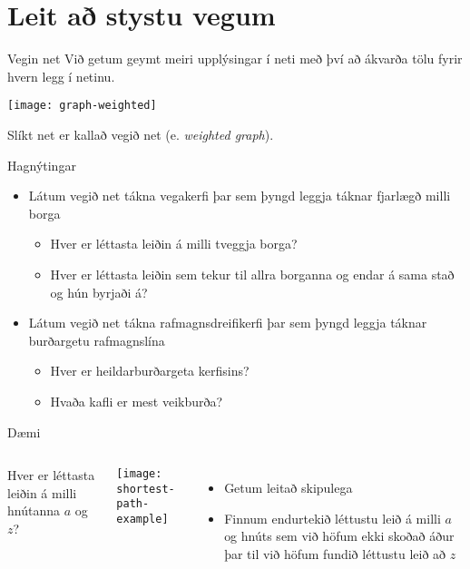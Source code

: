 \documentclass[handout]{beamer}
\begin{document}
\section{Leit að stystu vegum}

\begin{frame}{Vegin net}
Við getum geymt meiri upplýsingar í neti með því að ákvarða tölu fyrir hvern legg í netinu.
\begin{center}
\texttt{[image: graph-weighted]}
\end{center}
Slíkt net er kallað vegið net (e. \emph{weighted graph}).
\end{frame}

\begin{frame}{Hagnýtingar}
\begin{itemize}
 \item Látum vegið net tákna vegakerfi þar sem þyngd leggja táknar fjarlægð milli borga
 \begin{itemize}
  \item Hver er léttasta leiðin á milli tveggja borga?
  \item Hver er léttasta leiðin sem tekur til allra borganna og endar á sama stað og hún byrjaði á?
 \end{itemize}
 \item Látum vegið net tákna rafmagnsdreifikerfi þar sem þyngd leggja táknar burðargetu rafmagnslína
 \begin{itemize}
  \item Hver er heildarburðargeta kerfisins?
  \item Hvaða kafli er mest veikburða?
 \end{itemize}
\end{itemize}
\end{frame}

\begin{frame}{Dæmi}
\begin{columns}
Hver er léttasta leiðin á milli hnútanna $a$ og $z$?
\begin{center}
\texttt{[image: shortest-path-example]}
\end{center}
\begin{itemize}
 \item Getum leitað skipulega
 \item Finnum endurtekið léttustu leið á milli $a$ og hnúts sem við höfum ekki skoðað áður þar til við höfum fundið léttustu leið að $z$
\end{itemize}
\end{columns}
\end{frame}
\end{document}
